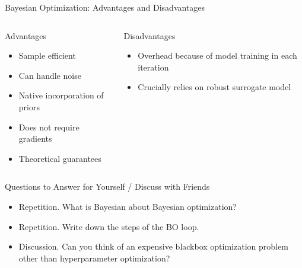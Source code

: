 \begin{frame}[c]{Bayesian Optimization: Advantages and Disadvantages}

\begin{columns}[T] %
\begin{column}{.48\textwidth}


\begin{block}{Advantages}
\begin{itemize}
  \item Sample efficient 
  \item Can handle noise
  \item Native incorporation of priors 
  \item Does not require gradients 
  \item Theoretical guarantees
\end{itemize}
\end{block}

\end{column}%

\hfill%
\pause 
\begin{column}{.48\textwidth}

\begin{block}{Disadvantages}
\begin{itemize}
  \item Overhead because of model training in each iteration 
  \item Crucially relies on robust surrogate model
\end{itemize}
\end{block}

\end{column}
\end{columns}

\end{frame}

\begin{frame}[c]{Questions to Answer for Yourself / Discuss with Friends}

\begin{itemize}
    \item \alert{Repetition.} What is Bayesian about Bayesian optimization?
\medskip
    \item \alert{Repetition.} Write down the steps of the BO loop.
\medskip
    \item \alert{Discussion.} Can you think of an expensive blackbox optimization problem other than hyperparameter optimization?
\end{itemize}

\end{frame}

